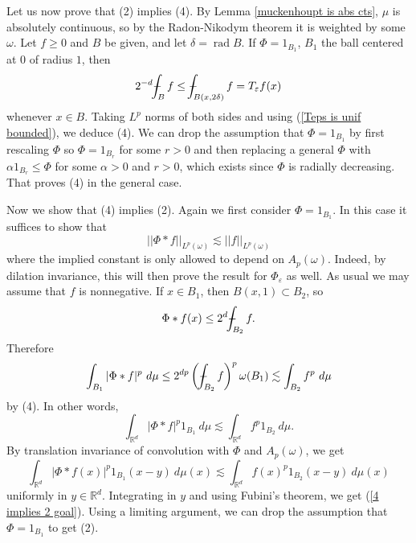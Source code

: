 \documentclass[12pt]{book}
\newcommand{\RR}{\mathbb{R}}
\DeclareMathOperator{\rad}{rad}
\def\Xint#1{\mathchoice
{\XXint\displaystyle\textstyle{#1}}%
{\XXint\textstyle\scriptstyle{#1}}%
{\XXint\scriptstyle\scriptscriptstyle{#1}}%
{\XXint\scriptscriptstyle\scriptscriptstyle{#1}}%
\!\int}
\def\XXint#1#2#3{{\setbox0=\hbox{$#1{#2#3}{\int}$ }
\vcenter{\hbox{$#2#3$ }}\kern-.6\wd0}}
\def\dashint{\Xint-}
\theoremstyle{definition}
\begin{document}
Let us now prove that (2) implies (4). By Lemma \ref{muckenhoupt is abs cts}, $\mu$ is absolutely continuous, so by the Radon-Nikodym theorem it is weighted by some $\omega$.
Let $f \geq 0$ and $B$ be given, and let $\delta = \rad B$. If $\Phi = 1_{B_1}$, $B_1$ the ball centered at $0$ of radius $1$, then
$$2^{-d} \dashint_B f \leq \dashint_{B(x, 2\delta)} f = T_\varepsilon f(x)$$
whenever $x \in B$. Taking $L^p$ norms of both sides and using (\ref{Teps is unif bounded}), we deduce (4).
We can drop the assumption that $\Phi = 1_{B_1}$ by first rescaling $\Phi$ so $\Phi = 1_{B_r}$ for some $r > 0$ and then replacing a general $\Phi$ with $\alpha 1_{B_r} \leq \Phi$ for some $\alpha > 0$ and $r > 0$, which exists since $\Phi$ is radially decreasing.
That proves (4) in the general case.

Now we show that (4) implies (2). Again we first consider $\Phi = 1_{B_1}$. In this case it suffices to show that
\begin{equation}
\label{4 implies 2 goal}
||\Phi * f||_{L^p(\omega)} \lesssim ||f||_{L^p(\omega)}
\end{equation}
where the implied constant is only allowed to depend on $A_p(\omega)$. Indeed, by dilation invariance, this will then prove the result for $\Phi_\varepsilon$ as well.
As usual we may assume that $f$ is nonnegative. If $x \in B_1$, then $B(x, 1) \subset B_2$, so
$$\Phi * f(x) \leq 2^d \dashint_{B_2} f.$$
Therefore
$$\int_{B_1} |\Phi * f|^p ~d\mu \leq 2^{dp} \left(\dashint_{B_2} f\right)^p \omega(B_1) \lesssim \int_{B_2} f^p ~d\mu$$
by (4). In other words,
$$\int_{\RR^d} |\Phi * f|^p 1_{B_1} ~d\mu \lesssim \int_{\RR^d} f^p 1_{B_2} ~d\mu.$$
By translation invariance of convolution with $\Phi$ and $A_p(\omega)$, we get
$$\int_{\RR^d} |\Phi * f(x)|^p 1_{B_1}(x - y) ~d\mu(x) \lesssim \int_{\RR^d} f(x)^p 1_{B_2}(x - y) ~d\mu(x)$$
uniformly in $y \in \RR^d$. Integrating in $y$ and using Fubini's theorem, we get (\ref{4 implies 2 goal}).
Using a limiting argument, we can drop the assumption that $\Phi = 1_{B_1}$ to get (2).
\end{document}
